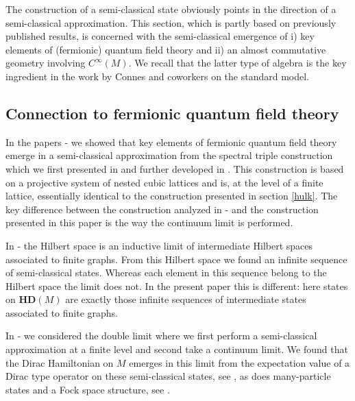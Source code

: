 \documentclass[12pt]{article}
\begin{document}
The construction of a semi-classical state 
obviously points in the direction of a semi-classical approximation. This section, which is partly based on previously published results, is concerned with the semi-classical emergence of i) key elements of (fermionic) quantum field theory and ii) an almost commutative geometry involving $C^{\infty}(M)$. We recall that the latter type of algebra is the key ingredient in the work by Connes and coworkers on the standard model.





\subsection{Connection to fermionic quantum field theory}


In the papers \cite{AGNP1}-\cite{Aastrup:2011dt} we showed that key elements of fermionic quantum field theory emerge in a semi-classical approximation from the spectral triple construction which we first presented in \cite{AGN1,AGN2} and further developed in \cite{AGN3}. This construction is based on a projective system of nested cubic lattices and is, at the level of a finite lattice, essentially identical to the construction presented in section \ref{hulk}. 
The key difference between the construction analyzed in \cite{AGNP1}-\cite{Aastrup:2011dt} and the construction presented in this paper is the way the continuum limit is performed. 

In \cite{AGNP1}-\cite{Aastrup:2011dt} the Hilbert space is an inductive limit of intermediate Hilbert spaces associated to finite graphs. From this Hilbert space we found an infinite sequence of semi-classical states. Whereas each element in this sequence belong to the Hilbert space the limit does not. In the present paper this is different: here states on $\mathbf{HD}(M) $ are exactly those infinite sequences of intermediate states associated to finite graphs. 

In \cite{AGNP1}-\cite{Aastrup:2011dt} we considered the double limit where we first perform a semi-classical approximation at a finite level and second take a continuum limit. We found that the Dirac Hamiltonian on $M$ emerges in this limit from the expectation value of a Dirac type operator on these semi-classical states, see \cite{Aastrup:2010ds}, as does many-particle states and a Fock space structure, see \cite{Aastrup:2011dt}. 
\end{document}
